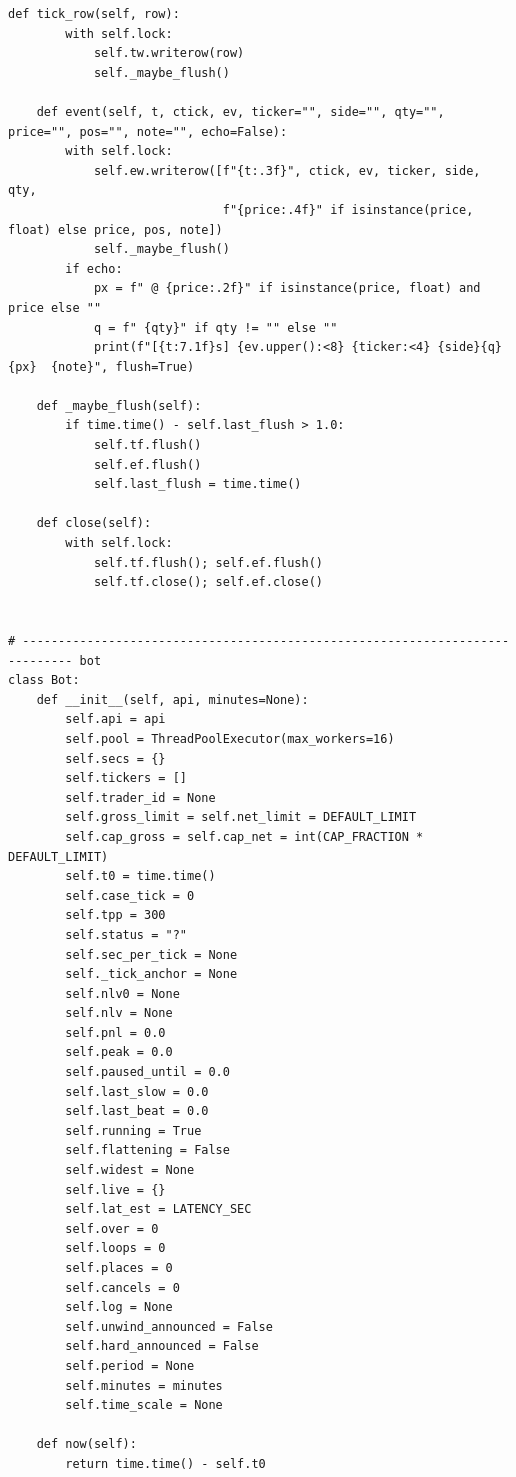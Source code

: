 \begin{lstlisting}[style=algocode]
    def tick_row(self, row):
        with self.lock:
            self.tw.writerow(row)
            self._maybe_flush()

    def event(self, t, ctick, ev, ticker="", side="", qty="", price="", pos="", note="", echo=False):
        with self.lock:
            self.ew.writerow([f"{t:.3f}", ctick, ev, ticker, side, qty,
                              f"{price:.4f}" if isinstance(price, float) else price, pos, note])
            self._maybe_flush()
        if echo:
            px = f" @ {price:.2f}" if isinstance(price, float) and price else ""
            q = f" {qty}" if qty != "" else ""
            print(f"[{t:7.1f}s] {ev.upper():<8} {ticker:<4} {side}{q}{px}  {note}", flush=True)

    def _maybe_flush(self):
        if time.time() - self.last_flush > 1.0:
            self.tf.flush()
            self.ef.flush()
            self.last_flush = time.time()

    def close(self):
        with self.lock:
            self.tf.flush(); self.ef.flush()
            self.tf.close(); self.ef.close()


# ----------------------------------------------------------------------------- bot
class Bot:
    def __init__(self, api, minutes=None):
        self.api = api
        self.pool = ThreadPoolExecutor(max_workers=16)
        self.secs = {}
        self.tickers = []
        self.trader_id = None
        self.gross_limit = self.net_limit = DEFAULT_LIMIT
        self.cap_gross = self.cap_net = int(CAP_FRACTION * DEFAULT_LIMIT)
        self.t0 = time.time()
        self.case_tick = 0
        self.tpp = 300
        self.status = "?"
        self.sec_per_tick = None
        self._tick_anchor = None
        self.nlv0 = None
        self.nlv = None
        self.pnl = 0.0
        self.peak = 0.0
        self.paused_until = 0.0
        self.last_slow = 0.0
        self.last_beat = 0.0
        self.running = True
        self.flattening = False
        self.widest = None
        self.live = {}
        self.lat_est = LATENCY_SEC
        self.over = 0
        self.loops = 0
        self.places = 0
        self.cancels = 0
        self.log = None
        self.unwind_announced = False
        self.hard_announced = False
        self.period = None
        self.minutes = minutes
        self.time_scale = None

    def now(self):
        return time.time() - self.t0


\end{lstlisting}
